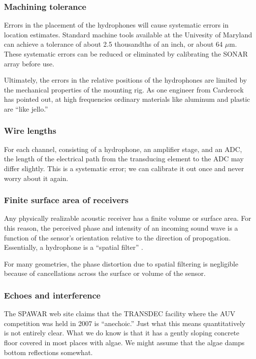 \documentclass[10pt]{article}
\begin{document}
\subsubsection{Machining tolerance}

Errors in the placement of the hydrophones will cause systematic errors in location estimates.  Standard machine tools available at the Univesity of Maryland can achieve a tolerance of about 2.5 thousandths of an inch, or about 64 \(\mu\)m.  These systematic errors can be reduced or eliminated by calibrating the SONAR array before use.

Ultimately, the errors in the relative positions of the hydrophones are limited by the mechanical properties of the mounting rig.  As one engineer from Carderock has pointed out, at high frequencies ordinary materials like aluminum and plastic are ``like jello.''

\subsubsection{Wire lengths}

For each channel, consisting of a hydrophone, an amplifier stage, and an ADC, the length of the electrical path from the transducing element to the ADC may differ slightly.  This is a systematic error; we can calibrate it out once and never worry about it again.

\subsubsection{Finite surface area of receivers}

Any physically realizable acoustic receiver has a finite volume or surface area.  For this reason, the perceived phase and intensity of an incoming sound wave is a function of the sensor's orientation relative to the direction of propogation.  Essentially, a hydrophone is a ``spatial filter'' \cite{Jensen}.

For many geometries, the phase distortion due to spatial filtering is negligible because of cancellations across the surface or volume of the sensor.

\subsubsection{Echoes and interference}

The SPAWAR web site claims that the TRANSDEC facility \cite{transdec-anechoic} where the AUV competition was held in 2007 is ``anechoic.''  Just what this means quantitatively is not entirely clear.  What we do know is that it has a gently sloping concrete floor covered in most places with algae.  We might assume that the algae damps bottom reflections somewhat.
\end{document}
